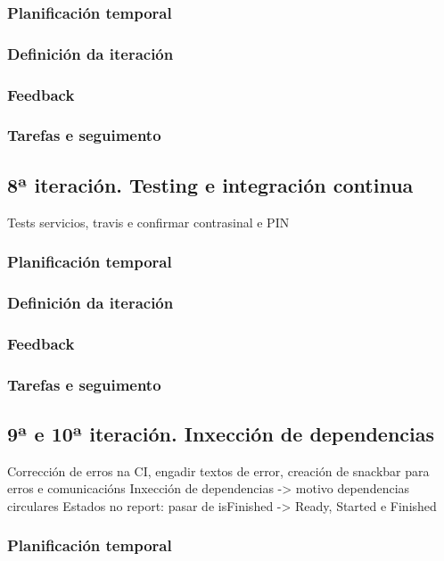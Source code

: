       \subsubsection{Planificación temporal}
      \subsubsection{Definición da iteración}
      \subsubsection{Feedback}
      \subsubsection{Tarefas e seguimento}

    \subsection{8ª iteración. Testing e integración continua}
    Tests servicios, travis e confirmar contrasinal e PIN
      \subsubsection{Planificación temporal}
      \subsubsection{Definición da iteración}
      \subsubsection{Feedback}
      \subsubsection{Tarefas e seguimento}

    \subsection{9ª e 10ª iteración. Inxección de dependencias}
    Corrección de erros na CI, engadir textos de error, creación de snackbar para erros e comunicacións
    Inxección de dependencias -> motivo dependencias circulares
    Estados no report: pasar de isFinished -> Ready, Started e Finished
      \subsubsection{Planificación temporal}
